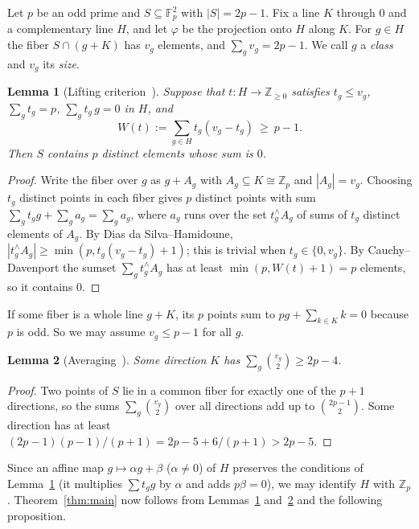 \documentclass[11pt]{article}
\newtheorem{lemma}{Lemma}[section]
\theoremstyle{remark}
\newcommand{\Z}{\mathbb{Z}}
\begin{document}
Let $p$ be an odd prime and $S\subseteq\mathbb F_p^2$ with $|S|=2p-1$. Fix a line $K$ through $0$ and a complementary line $H$, and let $\varphi$ be the projection onto $H$ along $K$. For $g\in H$ the fiber $S\cap(g+K)$ has $v_g$ elements, and $\sum_g v_g=2p-1$. We call $g$ a \emph{class} and $v_g$ its \emph{size}.

\begin{lemma}[Lifting criterion~\cite{GT,GHST}]\label{lem:lift}
Suppose that $t\colon H\to\Z_{\ge0}$ satisfies $t_g\le v_g$, $\sum_g t_g=p$, $\sum_g t_g\,g=0$ in $H$, and
\[
W(t):=\sum_{g\in H}t_g(v_g-t_g)\ \ge\ p-1 .
\]
Then $S$ contains $p$ distinct elements whose sum is $0$.
\end{lemma}

\begin{proof}
Write the fiber over $g$ as $g+A_g$ with $A_g\subseteq K\cong\Z_p$ and $|A_g|=v_g$. Choosing $t_g$ distinct points in each fiber gives $p$ distinct points with sum $\sum_g t_g g+\sum_g a_g=\sum_g a_g$, where $a_g$ runs over the set $t_g^\wedge A_g$ of sums of $t_g$ distinct elements of $A_g$. By Dias da Silva--Hamidoune, $|t_g^\wedge A_g|\ge\min(p,t_g(v_g-t_g)+1)$; this is trivial when $t_g\in\{0,v_g\}$. By Cauchy--Davenport the sumset $\sum_g t_g^\wedge A_g$ has at least $\min(p,W(t)+1)=p$ elements, so it contains $0$.
\end{proof}

If some fiber is a whole line $g+K$, its $p$ points sum to $pg+\sum_{k\in K}k=0$ because $p$ is odd. So we may assume $v_g\le p-1$ for all $g$.

\begin{lemma}[Averaging~\cite{GT,GGS}]\label{lem:avg}
Some direction $K$ has $\sum_g\binom{v_g}{2}\ge 2p-4$.
\end{lemma}

\begin{proof}
Two points of $S$ lie in a common fiber for exactly one of the $p+1$ directions, so the sums $\sum_g\binom{v_g}2$ over all directions add up to $\binom{2p-1}2$. Some direction has at least $(2p-1)(p-1)/(p+1)=2p-5+6/(p+1)>2p-5$.
\end{proof}

Since an affine map $g\mapsto\alpha g+\beta$ ($\alpha\ne0$) of $H$ preserves the conditions of Lemma~\ref{lem:lift} (it multiplies $\sum t_g g$ by $\alpha$ and adds $p\beta=0$), we may identify $H$ with $\Z_p$. Theorem~\ref{thm:main} now follows from Lemmas~\ref{lem:lift} and~\ref{lem:avg} and the following proposition.
\end{document}
